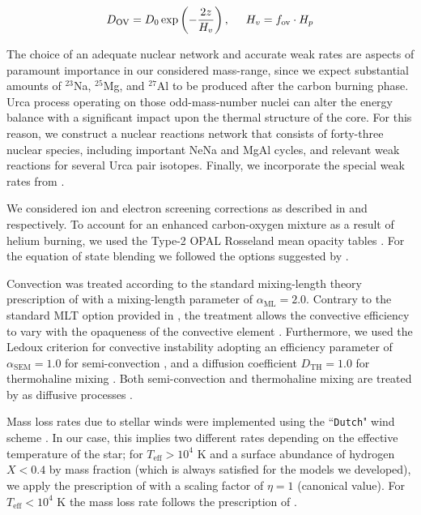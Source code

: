 \documentclass[../../main/thesis_msc.tex]{subfiles}
\begin{document}
    \begin{align}
    	\label{eq:OV}
    	D_{\text{OV}} = D_0 \exp \left( - \frac{2z}{H_v} \right), \hspace{0.5cm} H_v = f_{\text{ov}} \cdot H_p
    \end{align}

The choice of an adequate nuclear network and accurate weak rates are aspects of paramount importance in our considered mass-range, since we expect substantial amounts of $^{23}$Na, $^{25}$Mg, and $^{27}$Al to be produced after the carbon burning phase. Urca process operating on those odd-mass-number nuclei can alter the energy balance with a significant impact upon the thermal structure of the core. For this reason, we construct a nuclear reactions network that consists of forty-three nuclear species, including important NeNa and MgAl cycles, and relevant weak reactions for several Urca pair isotopes. Finally, we incorporate the special weak rates from \cite{Suzuki:2015iry}.

We considered ion and electron screening corrections as described in \cite{PCR2009} and \cite{Itoh2002} respectively. To account for an enhanced carbon-oxygen mixture as a result of helium burning, we used the Type-2 OPAL Rosseland mean opacity tables \citep{OPAL}. For the equation of state blending we followed the options suggested by \cite{Schwab:2017epw}.

Convection was treated according to the standard mixing-length theory prescription of \cite{MLT_Henyey} with a mixing-length parameter of $\alpha_{\text{ML}} = 2.0$. Contrary to the standard MLT option provided in \mesa, the \cite{MLT_Henyey} treatment allows the convective efficiency to vary with the opaqueness of the convective element \citep{Paxton2011}. Furthermore, we used the Ledoux criterion for convective instability adopting an efficiency parameter of $\alpha_{\text{SEM}} = 1.0$ for semi-convection \citep{Langer1991}, and a diffusion coefficient $D_{\text{TH}} = 1.0$ for thermohaline mixing \citep{Brown_2013}. Both semi-convection and thermohaline mixing are treated by \mesa as diffusive processes \citep{Langer1983, Kipp_thermohaline}. 


Mass loss rates due to stellar winds were implemented using the ``\texttt{Dutch}" wind scheme \citep{Dutch}. In our case, this implies two different rates depending on the effective temperature of the star; for $T_{\text{eff}} > 10^4$ K and a surface abundance of hydrogen $X < 0.4$ by mass fraction (which is always satisfied for the models we developed), we apply the prescription of \cite{Nugis2000} with a scaling factor of $\eta = 1$ (canonical value). For $T_{\text{eff}} < 10^4$ K the mass loss rate follows the prescription of \cite{deJager1988}. 
\end{document}
